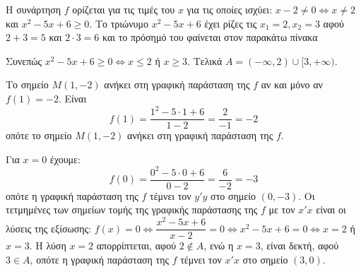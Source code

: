 
\begin{alist}
\item Η συνάρτηση $f$ ορίζεται για τις τιμές του $x$ για τις οποίες ισχύει: $x - 2 \neq 0 \Leftrightarrow x \neq 2$ και
$x^2 - 5x + 6 \ge 0$.
Το τριώνυμο $x^2 - 5x + 6$ έχει ρίζες τις $x_1 = 2, x_2 = 3$ αφού $2 + 3 = 5$ και $2 \cdot 3 = 6$ και το
πρόσημό του φαίνεται στον παρακάτω πίνακα

\begin{center}
\end{center}

Συνεπώς $x^2 - 5x + 6 \ge 0 \Leftrightarrow x \le 2$ ή $x \ge 3$.
Τελικά $A = (-\infty, 2) \cup [3, +\infty)$.

\item Το σημείο $M(1, -2)$ ανήκει στη γραφική παράσταση της $f$ αν και μόνο αν
$f(1) = -2$.
Είναι
\[f(1) = \dfrac{1^2 - 5 \cdot 1 + 6}{1 - 2} = \dfrac{2}{-1} = -2\]
οπότε το σημείο $M(1, -2)$ ανήκει στη γραφική παράσταση της $f$.

\item Για $x = 0$ έχουμε:
\[f(0) = \dfrac{0^2 - 5 \cdot 0 + 6}{0 - 2} = \dfrac{6}{-2} = -3\]
οπότε η γραφική παράσταση της $f$ τέμνει τον $y'y$ στο σημείο $(0, -3)$.
Οι τετμημένες των σημείων τομής της γραφικής παράστασης της $f$ με τον $x'x$ είναι οι λύσεις της εξίσωσης:
$f(x) = 0 \Leftrightarrow \dfrac{x^2 - 5x + 6}{x - 2} = 0 \Leftrightarrow x^2 - 5x + 6 = 0 \Leftrightarrow x = 2$ ή $x = 3$.
Η λύση $x = 2$ απορρίπτεται, αφού $2 \notin A$, ενώ η $x = 3$, είναι δεκτή, αφού $3 \in A$, οπότε η
γραφική παράσταση της $f$ τέμνει τον $x'x$ στο σημείο $(3, 0)$.
\end{alist}

